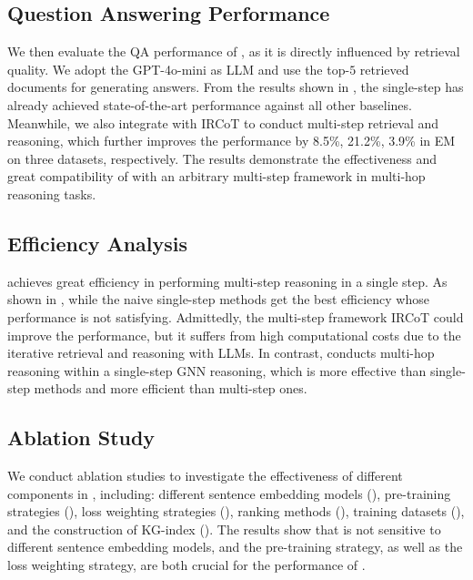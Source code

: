 \subsection{Question Answering Performance}\label{sec:qa}

We then evaluate the QA performance of \ourmethod, as it is directly influenced by retrieval quality. We adopt the GPT-4o-mini \citep{gpt4o} as LLM and use the top-$5$ retrieved documents for generating answers. From the results shown in , the single-step \ourmethod has already achieved state-of-the-art performance against all other baselines. Meanwhile, we also integrate \ourmethod with IRCoT to conduct multi-step retrieval and reasoning, which further improves the performance by 8.5\%, 21.2\%, 3.9\% in EM on three datasets, respectively. The results demonstrate the effectiveness and great compatibility of \ourmethod with an arbitrary multi-step framework in multi-hop reasoning tasks.

\subsection{Efficiency Analysis}\label{sec:efficiency}

\ourmethod achieves great efficiency in performing multi-step reasoning in a single step. As shown in , while the naive single-step methods get the best efficiency whose performance is not satisfying. Admittedly, the multi-step framework IRCoT could improve the performance, but it suffers from high computational costs due to the iterative retrieval and reasoning with LLMs. In contrast, \ourmethod conducts multi-hop reasoning within a single-step GNN reasoning, which is more effective than single-step methods and more efficient than multi-step ones.

\subsection{Ablation Study}\label{sec:ablation}
We conduct ablation studies to investigate the effectiveness of different components in \ourmethod, including: different sentence embedding models (), pre-training strategies (), loss weighting strategies (), ranking methods (), training datasets (), and the construction of KG-index (). The results show that \ourmethod is not sensitive to different sentence embedding models, and the pre-training strategy, as well as the loss weighting strategy, are both crucial for the performance of \ourmethod.

